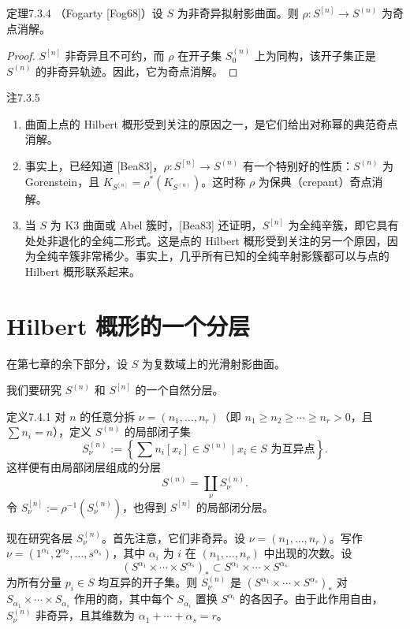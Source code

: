 \begin{origstatement}{定理}{7.3.4}\label{ch07:7.3.4}
（Fogarty [Fog68]）设 $S$ 为非奇异拟射影曲面。则 $\rho:S^{[n]}\to S^{(n)}$ 为奇点消解。
\end{origstatement}
\begin{proof}
$S^{[n]}$ 非奇异且不可约，而 $\rho$ 在开子集 $S_0^{(n)}$ 上为同构，该开子集正是 $S^{(n)}$ 的非奇异轨迹。因此，它为奇点消解。
\end{proof}
\begin{origstatement}{注}{7.3.5}\label{ch07:7.3.5}
\begin{enumerate}[label=(\arabic*)]
\item 曲面上点的 Hilbert 概形受到关注的原因之一，是它们给出对称幂的典范奇点消解。
\item 事实上，已经知道 [Bea83]，$\rho:S^{[n]}\to S^{(n)}$ 有一个特别好的性质：$S^{(n)}$ 为 Gorenstein，且 $K_{S^{[n]}}=\rho^*(K_{S^{(n)}})$。这时称 $\rho$ 为保典（crepant）奇点消解。
\item 当 $S$ 为 K3 曲面或 Abel 簇时，[Bea83] 还证明，$S^{[n]}$ 为全纯辛簇，即它具有处处非退化的全纯二形式。这是点的 Hilbert 概形受到关注的另一个原因，因为全纯辛簇非常稀少。事实上，几乎所有已知的全纯辛射影簇都可以与点的 Hilbert 概形联系起来。
\end{enumerate}
\end{origstatement}
\section{Hilbert 概形的一个分层}
在第七章的余下部分，设 $S$ 为复数域上的光滑射影曲面。

我们要研究 $S^{(n)}$ 和 $S^{[n]}$ 的一个自然分层。
\begin{origstatement}{定义}{7.4.1}\label{ch07:7.4.1}
对 $n$ 的任意分拆 $\nu=(n_1,\ldots,n_r)$（即 $n_1\geq n_2\geq\cdots\geq n_r>0$，且 $\sum n_i=n$），定义 $S^{(n)}$ 的局部闭子集
\[
S_\nu^{(n)}:=\left\{\sum n_i[x_i]\in S^{(n)}\mid
x_i\in S\text{ 为互异点}\right\}.
\]
这样便有由局部闭层组成的分层
\[
S^{(n)}=\coprod_\nu S_\nu^{(n)}.
\]
令 $S_\nu^{[n]}:=\rho^{-1}(S_\nu^{(n)})$，也得到 $S^{[n]}$ 的局部闭分层。
\end{origstatement}
现在研究各层 $S_\nu^{(n)}$。首先注意，它们非奇异。设 $\nu=(n_1,\ldots,n_r)$。写作 $\nu=(1^{\alpha_1},\allowbreak 2^{\alpha_2},\ldots,\allowbreak s^{\alpha_s})$，其中 $\alpha_i$ 为 $i$ 在 $(n_1,\ldots,n_r)$ 中出现的次数。设
\[
(S^{\alpha_1}\times\cdots\times S^{\alpha_s})_*\subset S^{\alpha_1}\times\cdots\times S^{\alpha_s}
\]
为所有分量 $p_i\in S$ 均互异的开子集。则 $S_\nu^{(n)}$ 是 $(S^{\alpha_1}\times\cdots\times S^{\alpha_s})_*$ 对 $S_{\alpha_1}\times\cdots\times S_{\alpha_s}$ 作用的商，其中每个 $S_{\alpha_i}$ 置换 $S^{\alpha_i}$ 的各因子。由于此作用自由，$S_\nu^{(n)}$ 非奇异，且其维数为 $\alpha_1+\cdots+\alpha_s=r$。

